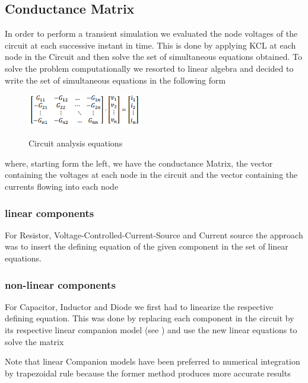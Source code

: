 \documentclass{article}
\begin{document}
\subsection{Conductance Matrix}
In order to perform a transient simulation we evaluated the node voltages of the circuit at each successive instant in time. This is done by applying KCL at each node in the Circuit and then solve the set of simultaneous equations obtained.\bigbreak
To solve the problem computationally we resorted to linear algebra and decided to write the set of simultaneous equations in the following form
\begin{figure}[h]
    \caption{Circuit analysis equations}
    \centering
    \includegraphics[width=5cm]{images/Conductance_Matrix.PNG}
    \label{fig:ConductanceMat}
\end{figure}

where, starting form the left, we have the conductance Matrix, the vector containing the voltages at each node in the circuit and the vector containing the currents flowing into each node
\subsubsection{linear components}
For Resistor, Voltage-Controlled-Current-Source and Current source the approach was to insert the defining equation of the given component in the set of linear equations. 
\subsubsection{non-linear components}
For Capacitor, Inductor and Diode we first had to linearize the respective defining equation.
This was done by replacing each component in the circuit by its respective linear companion model (see \cite{LinearCompanionModels}) and use the new linear equations to solve the matrix\bigbreak

Note that linear Companion models have been preferred to numerical integration by trapezoidal rule because the former method produces more accurate results
\end{document}
